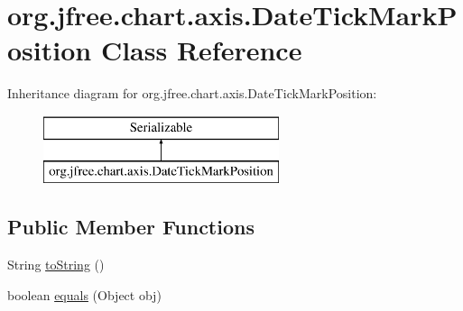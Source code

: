 \hypertarget{classorg_1_1jfree_1_1chart_1_1axis_1_1_date_tick_mark_position}{}\section{org.\+jfree.\+chart.\+axis.\+Date\+Tick\+Mark\+Position Class Reference}
\label{classorg_1_1jfree_1_1chart_1_1axis_1_1_date_tick_mark_position}
Inheritance diagram for org.\+jfree.\+chart.\+axis.\+Date\+Tick\+Mark\+Position\+:\begin{figure}[H]
\begin{center}
\leavevmode
\includegraphics[height=2.000000cm]{classorg_1_1jfree_1_1chart_1_1axis_1_1_date_tick_mark_position}
\end{center}
\end{figure}
\subsection*{Public Member Functions}
\begin{DoxyCompactItemize}
\item 
String \mbox{\hyperlink{classorg_1_1jfree_1_1chart_1_1axis_1_1_date_tick_mark_position_a3ac880ef58ee8037c9ad507589a8e79e}{to\+String}} ()
\item 
boolean \mbox{\hyperlink{classorg_1_1jfree_1_1chart_1_1axis_1_1_date_tick_mark_position_ab8ffaabf8f0a5cdb6238b8b51e430743}{equals}} (Object obj)
\end{DoxyCompactItemize}
